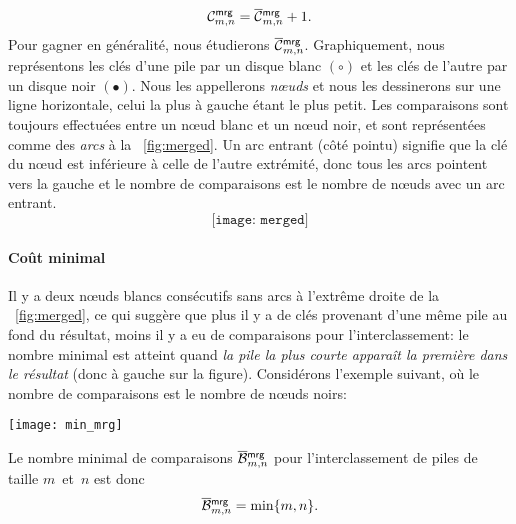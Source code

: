 \begin{equation}
\C{\fun{mrg}}{m,n} = \OC{\fun{mrg}}{m,n} + 1.\label{def:cost_mrg}
\end{equation}
Pour gagner en généralité, nous étudierons
\(\OC{\fun{mrg}}{m,n}\). Graphiquement, nous représentons les clés
d'une pile par un disque blanc \((\circ)\) et les clés de l'autre par
un disque noir \((\bullet)\). Nous les appellerons \emph{nœuds} et
nous les dessinerons sur une ligne horizontale, celui la plus à gauche
étant le plus petit. Les comparaisons sont toujours effectuées entre
un nœud blanc et un nœud noir, et sont représentées comme des
\emph{arcs} à la \fig~\vref{fig:merged}.  Un arc entrant (côté pointu)
signifie que la clé du nœud est inférieure à celle de l'autre
extrémité, donc tous les arcs pointent vers la gauche et le nombre de
comparaisons est le nombre de nœuds avec un arc entrant.
\begin{equation}
\texttt{[image: merged]}%
\label{fig:merged}
\end{equation}

\paragraph{Coût minimal}
\label{merge_best_case}

Il y a deux nœuds blancs consécutifs sans arcs à l'extrême droite
de la \fig~\vref{fig:merged}, ce qui suggère que plus il y a de clés
provenant d'une même pile au fond du résultat, moins il y a eu de
comparaisons pour l'interclassement: le nombre minimal est atteint
quand \emph{la pile la plus courte apparaît la première dans le
  résultat} (donc à gauche sur la figure). Considérons l'exemple
suivant, où le nombre de comparaisons est le nombre de nœuds
noirs:
\begin{center}
\texttt{[image: min\_mrg]}
\end{center}
Le nombre minimal de comparaisons
\(\OB{\fun{mrg}}{m,n}\) pour
l'interclassement de piles de taille \(m\)~et~\(n\) est donc
\begin{equation}
\OB{\fun{mrg}}{m,n} = \min\{m,n\}.\label{eq:best_merge}
\end{equation}

